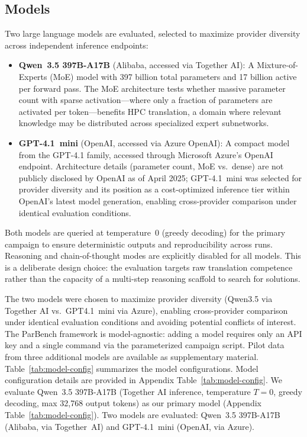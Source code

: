 \documentclass{article}
\begin{document}
\subsection{Models}
\label{sec:models}

Two large language models are evaluated, selected to maximize provider diversity across independent inference endpoints:

\begin{itemize}
\item \textbf{Qwen~3.5 397B-A17B} (Alibaba, accessed via Together AI): A Mixture-of-Experts (MoE) model with 397 billion total parameters and 17 billion active per forward pass. The MoE architecture tests whether massive parameter count with sparse activation---where only a fraction of parameters are activated per token---benefits HPC translation, a domain where relevant knowledge may be distributed across specialized expert subnetworks.

\item \textbf{GPT-4.1~mini} (OpenAI, accessed via Azure OpenAI): A compact model from the GPT-4.1 family, accessed through Microsoft Azure's OpenAI endpoint. Architecture details (parameter count, MoE vs.\ dense) are not publicly disclosed by OpenAI as of April 2025; GPT-4.1~mini was selected for provider diversity and its position as a cost-optimized inference tier within OpenAI's latest model generation, enabling cross-provider comparison under identical evaluation conditions.
\end{itemize}

Both models are queried at temperature~0 (greedy decoding) for the primary campaign to ensure deterministic outputs and reproducibility across runs. Reasoning and chain-of-thought modes are explicitly disabled for all models. This is a deliberate design choice: the evaluation targets raw translation competence rather than the capacity of a multi-step reasoning scaffold to search for solutions.

The two models were chosen to maximize provider diversity (Qwen3.5 via Together AI vs.\ GPT4.1~mini via Azure), enabling cross-provider comparison under identical evaluation conditions and avoiding potential conflicts of interest. The ParBench framework is model-agnostic: adding a model requires only an API key and a single command via the parameterized campaign script. Pilot data from three additional models are available as supplementary material. Table~\ref{tab:model-config} summarizes the model configurations.
Model configuration details are provided in Appendix Table~\ref{tab:model-config}.
We evaluate Qwen~3.5 397B-A17B (Together AI inference, temperature $T=0$,
greedy decoding, max 32{,}768 output tokens) as our primary model
(Appendix Table~\ref{tab:model-config}).
Two models are evaluated: Qwen~3.5 397B-A17B (Alibaba, via Together~AI) and GPT-4.1~mini (OpenAI, via Azure).
\end{document}

